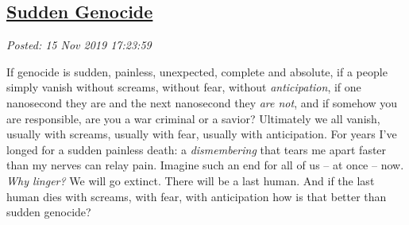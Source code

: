 %

\subsection*{\href{http://analyzethedatanotthedrivel.org/2019/11/15/sudden-genocide/}{Sudden Genocide}}


\noindent\emph{Posted: 15 Nov 2019 17:23:59}
\vspace{6pt}

If genocide is sudden, painless, unexpected, complete and absolute, if a
people simply vanish without screams, without fear, without
\emph{anticipation}, if one nanosecond they are and the next nanosecond
they \emph{are not}, and if somehow you are responsible, are you a war
criminal or a savior? Ultimately we all vanish, usually with screams,
usually with fear, usually with anticipation. For years I've longed for
a sudden painless death: a \emph{dismembering} that tears me apart
faster than my nerves can relay pain. Imagine such an end for all of us
-- at once -- now. \emph{Why linger?} We will go extinct. There will be
a last human. And if the last human dies with screams, with fear, with
anticipation how is that better than sudden genocide?



%
 

